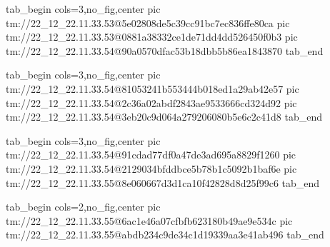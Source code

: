  
 
 
 
 

\qqSecCmtScr


\ifcmt
  tab_begin cols=3,no_fig,center
    pic tm://22_12_22.11.33.53@5e02808de5c39cc91bc7ec836ffe80ca
    pic tm://22_12_22.11.33.53@0881a38332ce1de71dd4dd526450f0b3
    pic tm://22_12_22.11.33.54@90a0570dfac53b18dbb5b86ea1843870
  tab_end
\fi


\ifcmt
  tab_begin cols=3,no_fig,center
    pic tm://22_12_22.11.33.54@81053241b553444b018ed1a29ab42e57
    pic tm://22_12_22.11.33.54@2c36a02abdf2843ae9533666cd324d92
    pic tm://22_12_22.11.33.54@3eb20c9d064a279206080b5e6c2c41d8
  tab_end
\fi


\ifcmt
  tab_begin cols=3,no_fig,center
    pic tm://22_12_22.11.33.54@91cdad77df0a47de3ad695a8829f1260
    pic tm://22_12_22.11.33.54@2129034bfddbce5b78b1c5092b1baf6e
    pic tm://22_12_22.11.33.55@8e060667d3d1ca10f42828d8d25f99c6
  tab_end
\fi


\ifcmt
  tab_begin cols=2,no_fig,center
    pic tm://22_12_22.11.33.55@6ac1e46a07cfbfb623180b49ae9e534c
    pic tm://22_12_22.11.33.55@abdb234c9de34c1d19339aa3e41ab496
  tab_end
\fi

